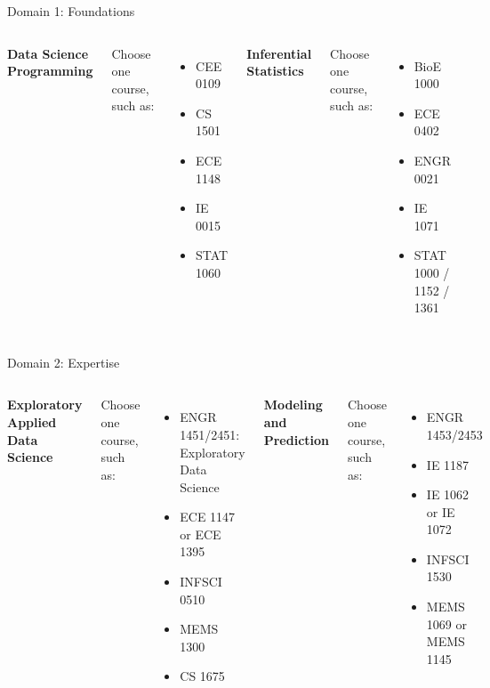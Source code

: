 \documentclass[aspectratio=169,11pt,t]{beamer}
\newcommand{\tightitems}{\setlength\itemsep{1pt}\setlength\parskip{0pt}}
\begin{document}
\begin{frame}[t]{Domain 1: Foundations}
\begin{columns}[T,onlytextwidth]
\textbf{Data Science Programming}\par
\vspace{0.15cm}
Choose one course, such as:
\begin{itemize}[<+->]
  \tightitems
  \item CEE 0109
  \item CS 1501
  \item ECE 1148
  \item IE 0015
  \item STAT 1060
\end{itemize}

\textbf{Inferential Statistics}\par
\vspace{0.15cm}
Choose one course, such as:
\begin{itemize}[<+->]
  \tightitems
  \item BioE 1000
  \item ECE 0402
  \item ENGR 0021
  \item IE 1071
  \item STAT 1000 / 1152 / 1361
\end{itemize}
\end{columns}
\end{frame}

\begin{frame}[t]{Domain 2: Expertise}
\begin{columns}[T,onlytextwidth]
\textbf{Exploratory Applied Data Science}\par
\vspace{0.15cm}
Choose one course, such as:
\begin{itemize}[<+->]
  \tightitems
  \item ENGR 1451/2451: Exploratory Data Science
  \item ECE 1147 or ECE 1395
  \item INFSCI 0510
  \item MEMS 1300
  \item CS 1675
\end{itemize}

\textbf{Modeling and Prediction}\par
\vspace{0.15cm}
Choose one course, such as:
\begin{itemize}[<+->]
  \tightitems
  \item ENGR 1453/2453
  \item IE 1187
  \item IE 1062 or IE 1072
  \item INFSCI 1530
  \item MEMS 1069 or MEMS 1145
\end{itemize}
\end{columns}
\end{frame}
\end{document}
